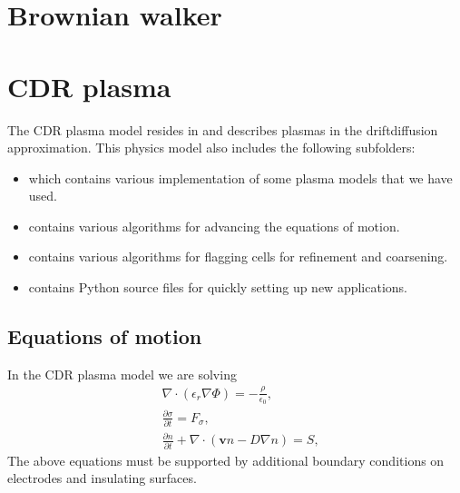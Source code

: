 \documentclass[letterpaper,10pt,english]{sphinxmanual}
\begin{document}
\section{Brownian walker}
\label{\detokenize{Applications/BrownianWalkerModel:brownian-walker}}\label{\detokenize{Applications/BrownianWalkerModel:chap-brownianwalkermodel}}\label{\detokenize{Applications/BrownianWalkerModel::doc}}

\section{CDR plasma}
\label{\detokenize{Applications/CdrPlasmaModel:cdr-plasma}}\label{\detokenize{Applications/CdrPlasmaModel:chap-cdrplasmamodel}}\label{\detokenize{Applications/CdrPlasmaModel::doc}}
The CDR plasma model resides in  and describes plasmas in the drift\sphinxhyphen{}diffusion approximation.
This physics model also includes the following subfolders:
\begin{itemize}
\item {} 
 which contains various implementation of some plasma models that we have used.

\item {} 
 contains various algorithms for advancing the equations of motion.

\item {} 
 contains various algorithms for flagging cells for refinement and coarsening.

\item {} 
 contains Python source files for quickly setting up new applications.

\end{itemize}


\subsection{Equations of motion}
\label{\detokenize{Applications/CdrPlasmaModel:equations-of-motion}}
In the CDR plasma model we are solving
\begin{equation*}
\begin{split}&\nabla\cdot\left(\epsilon_r\nabla\Phi\right) = -\frac{\rho}{\epsilon_0},\\
&\frac{\partial\sigma}{\partial t} = F_\sigma,\\
&\frac{\partial n}{\partial t} + \nabla\cdot\left(\mathbf{v} n - D\nabla n\right) = S,\end{split}
\end{equation*}
The above equations must be supported by additional boundary conditions on electrodes and insulating surfaces.
\end{document}
